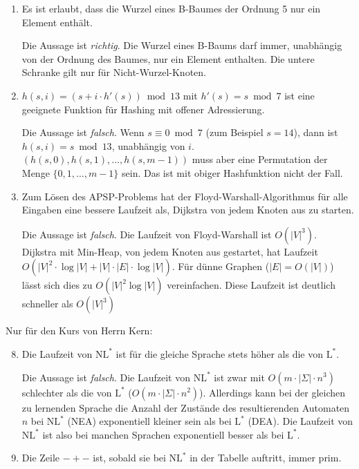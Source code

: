 \documentclass[11pt,a4paper]{article}
\begin{document}
\begin{loesung}
\begin{enumerate}
        \item Es ist erlaubt, dass die Wurzel eines B-Baumes der Ordnung 5 nur ein Element enthält.

        Die Aussage ist \emph{richtig}.
        Die Wurzel eines B-Baums darf immer, unabhängig von der Ordnung des Baumes, nur ein Element enthalten.
        Die untere Schranke gilt nur für Nicht-Wurzel-Knoten.
        \item $h(s, i) = (s + i \cdot h'(s)) \bmod 13$ mit $h'(s) = s \bmod 7$ ist eine geeignete Funktion für Hashing mit offener Adressierung.

        Die Aussage ist \emph{falsch}.
        Wenn $s \equiv 0 \bmod 7$ (zum Beispiel $s = 14$), dann ist $h(s, i) = s \bmod 13$, unabhängig von $i$.
        $(h(s, 0), h(s, 1), \ldots, h(s, m-1))$ muss aber eine Permutation der Menge $\{0, 1, \ldots, m-1\}$ sein.
        Das ist mit obiger Hashfunktion nicht der Fall.
        \item Zum Lösen des APSP-Problems hat der Floyd-Warshall-Algorithmus für alle Eingaben eine bessere Laufzeit als, Dijkstra von jedem Knoten aus zu starten.

        Die Aussage ist \emph{falsch}.
        Die Laufzeit von Floyd-Warshall ist $O(|V|^3)$.
        Dijkstra mit Min-Heap, von jedem Knoten aus gestartet, hat Laufzeit $O(|V|^2 \cdot \log |V| + |V|\cdot|E| \cdot\log |V|)$.
        Für dünne Graphen ($|E| = O(|V|)$) lässt sich dies zu $O(|V|^2 \log |V|)$ vereinfachen.
        Diese Laufzeit ist deutlich schneller als $O(|V|^3)$
    \end{enumerate}
    Nur für den Kurs von Herrn Kern:
    \begin{enumerate}
        \setcounter{enumi}{7}
        \item Die Laufzeit von $\mathrm{NL}^*$ ist für die gleiche Sprache stets höher als die von $\mathrm{L}^*$.

        Die Aussage ist \emph{falsch}.
        Die Laufzeit von $\mathrm{NL}^*$ ist zwar mit $O(m \cdot|\Sigma| \cdot n^3)$ schlechter als die von $\mathrm{L}^*$ ($O(m \cdot|\Sigma| \cdot n^2)$).
        Allerdings kann bei der gleichen zu lernenden Sprache die Anzahl der Zustände des resultierenden Automaten $n$ bei $\mathrm{NL}^*$ (NEA) exponentiell kleiner sein als bei $\mathrm{L}^*$ (DEA).
        Die Laufzeit von $\mathrm{NL}^*$ ist also bei manchen Sprachen exponentiell besser als bei $\mathrm{L}^*$.
        \item Die Zeile $-+-$ ist, sobald sie bei $\mathrm{NL}^*$ in der Tabelle auftritt, immer prim.


\end{enumerate}
\end{loesung}
\end{document}
